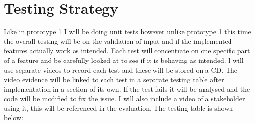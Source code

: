\documentclass[../../../../main.tex]{subfiles}
\begin{document}
\section{Testing Strategy}
Like in prototype 1 I will be doing unit tests however unlike prototype 1 this time the overall testing will be on the validation of input and if the implemented features actually work as intended. Each test will concentrate on one specific part of a feature and be carefully looked at to see if it is behaving as intended. I will use separate videos to record each test and these will be stored on a CD. The video evidence will be linked to each test in a separate testing table after implementation in a section of its own. If the test fails it will be analysed and the code will be modified to fix the issue. I will also include a video of a stakeholder using it, this will be referenced in the evaluation. The testing table is shown below:
\end{document}
